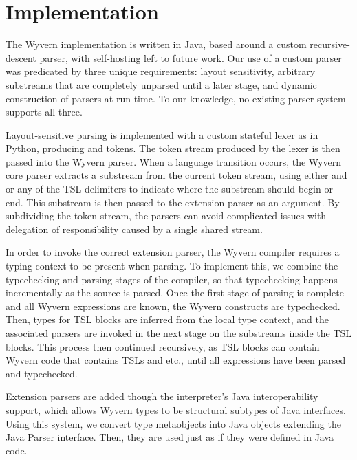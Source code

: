 
\section{Implementation}
\label{s:implementation}
The Wyvern implementation is written in Java, based around a custom recursive-descent parser, with self-hosting left to future work. Our use of a custom parser was predicated by three unique requirements: layout sensitivity, arbitrary substreams that are completely unparsed until a later stage, and dynamic construction of parsers at run time. To our knowledge, no existing parser system supports all three.

Layout-sensitive parsing is implemented with a custom stateful lexer as in Python, producing  and  tokens. The token stream produced by the lexer is then passed into the Wyvern parser. When a language transition occurs, the Wyvern core parser extracts a substream from the current token stream, using either  and  or any of the TSL delimiters to indicate where the substream should begin or end. This substream is then passed to the extension parser as an argument. By subdividing the token stream, the parsers can avoid complicated issues with delegation of responsibility caused by a single shared stream. 

In order to invoke the correct extension parser, the Wyvern compiler requires a typing context to be present when parsing. To implement this, we combine the typechecking and parsing stages of the compiler, so that typechecking happens incrementally as the source is parsed. Once the first stage of parsing is complete and all Wyvern expressions are known, the Wyvern constructs are typechecked. Then, types for TSL blocks are inferred from the local type context, and the associated parsers are invoked in the next stage on the substreams inside the TSL blocks. This process then continued recursively, as TSL blocks can contain Wyvern code that contains TSLs and etc., until all expressions have been parsed and typechecked.

Extension parsers are added though the interpreter's Java interoperability support, which allows Wyvern types to be structural subtypes of Java interfaces. Using this system, we convert type metaobjects into Java objects extending the Java Parser interface. Then, they are used just as if they were defined in Java code.
